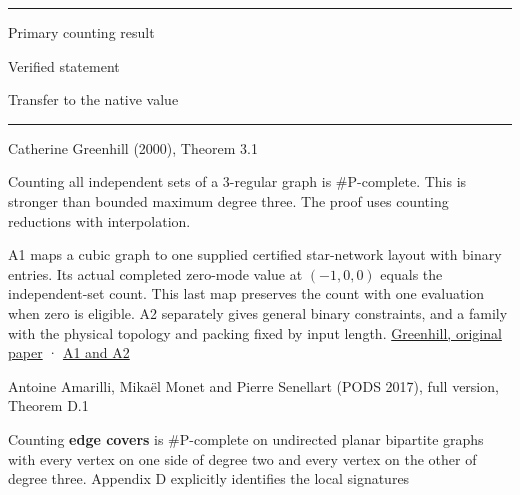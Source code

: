 \documentclass[11pt,a4paper]{article}
\newlength{\OfflineResearchTableWidth}
\newcommand{\OfflineResearchHeaderRule}{\noindent\rule{\linewidth}{0.45pt}\par}
\newcommand{\OfflineResearchRow}{\par}
\newenvironment{OfflineResearchTable}{%
  \par\medskip\begingroup\small\setlength{\parindent}{0pt}%
  \setlength{\parskip}{3pt plus 1pt minus .5pt}%
  \setlength{\OfflineResearchTableWidth}{\linewidth}%
}{%
  \par\endgroup\medskip%
}
\begin{document}
\begin{OfflineResearchTable}
\OfflineResearchHeaderRule
\noindent%
\begin{minipage}[t]{0.31500\OfflineResearchTableWidth}\raggedright
Primary counting result
\end{minipage}\hfill%
\begin{minipage}[t]{0.31500\OfflineResearchTableWidth}\raggedright
Verified statement
\end{minipage}\hfill%
\begin{minipage}[t]{0.31500\OfflineResearchTableWidth}\raggedright
Transfer to the native value
\end{minipage}%
\OfflineResearchRow
\nobreak
\OfflineResearchHeaderRule
\nobreak
\noindent%
\begin{minipage}[t]{0.31500\OfflineResearchTableWidth}\raggedright
Catherine Greenhill (2000), Theorem 3.1
\end{minipage}\hfill%
\begin{minipage}[t]{0.31500\OfflineResearchTableWidth}\raggedright
Counting all independent sets
of a 3-regular graph is \(\#\mathrm P\)-complete. This is stronger than
bounded maximum degree three. The proof uses counting reductions with
interpolation.
\end{minipage}\hfill%
\begin{minipage}[t]{0.31500\OfflineResearchTableWidth}\raggedright
A1 maps a cubic graph to one supplied certified
star-network layout with binary entries. Its actual completed zero-mode
value at \((-1,0,0)\) equals the independent-set count. This last map
preserves the count with one evaluation when zero is eligible. A2
separately gives general binary constraints, and a family with the
physical topology and packing fixed by input length.
\href{https://web.maths.unsw.edu.au/~csg/papers/complexity.pdf}{Greenhill,
original paper} ·
\hyperref[v9-a1-complexity-of-a-prescribed-root-register]{A1 and A2}
\end{minipage}%
\OfflineResearchRow
\noindent%
\begin{minipage}[t]{0.31500\OfflineResearchTableWidth}\raggedright
Antoine Amarilli, Mikaël Monet and Pierre Senellart (PODS 2017), full
version, Theorem D.1
\end{minipage}\hfill%
\begin{minipage}[t]{0.31500\OfflineResearchTableWidth}\raggedright
Counting \textbf{edge covers} is
\(\#\mathrm P\)-complete on undirected planar bipartite graphs with
every vertex on one side of degree two and every vertex on the other of
degree three. Appendix D explicitly identifies the local signatures

\end{minipage}
\end{OfflineResearchTable}
\end{document}
